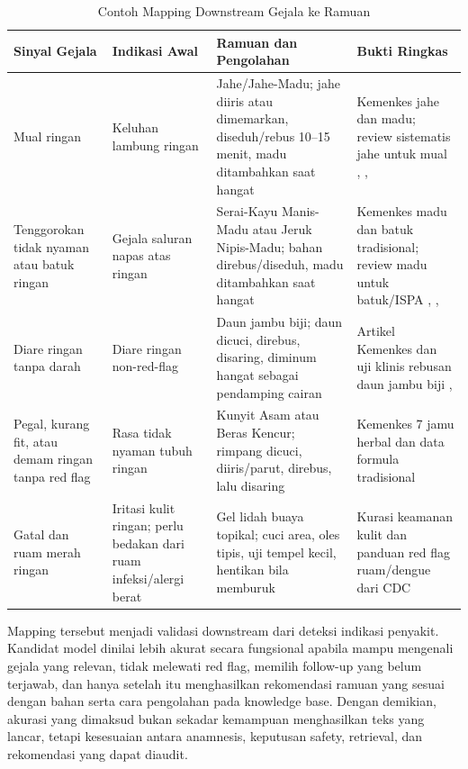 \documentclass[conference]{IEEEtran}
\begin{document}
\begin{table}[t]
\caption{Contoh Mapping Downstream Gejala ke Ramuan}
\label{tab:symptom_mapping_id}
\centering
\scriptsize
\setlength{\tabcolsep}{2pt}
\begin{tabular}{|p{1.35cm}|p{1.55cm}|p{2.2cm}|p{2.15cm}|}
\hline
\textbf{Sinyal Gejala} & \textbf{Indikasi Awal} & \textbf{Ramuan dan Pengolahan} & \textbf{Bukti Ringkas} \\
\hline
Mual ringan & Keluhan lambung ringan & Jahe/Jahe-Madu; jahe diiris atau dimemarkan, diseduh/rebus 10--15 menit, madu ditambahkan saat hangat & Kemenkes jahe dan madu; review sistematis jahe untuk mual \cite{b16}, \cite{b17}, \cite{b23} \\
\hline
Tenggorokan tidak nyaman atau batuk ringan & Gejala saluran napas atas ringan & Serai-Kayu Manis-Madu atau Jeruk Nipis-Madu; bahan direbus/diseduh, madu ditambahkan saat hangat & Kemenkes madu dan batuk tradisional; review madu untuk batuk/ISPA \cite{b17}, \cite{b18}, \cite{b24} \\
\hline
Diare ringan tanpa darah & Diare ringan non-red-flag & Daun jambu biji; daun dicuci, direbus, disaring, diminum hangat sebagai pendamping cairan & Artikel Kemenkes dan uji klinis rebusan daun jambu biji \cite{b20}, \cite{b22} \\
\hline
Pegal, kurang fit, atau demam ringan tanpa red flag & Rasa tidak nyaman tubuh ringan & Kunyit Asam atau Beras Kencur; rimpang dicuci, diiris/parut, direbus, lalu disaring & Kemenkes 7 jamu herbal dan data formula tradisional \cite{b19} \\
\hline
Gatal dan ruam merah ringan & Iritasi kulit ringan; perlu bedakan dari ruam infeksi/alergi berat & Gel lidah buaya topikal; cuci area, oles tipis, uji tempel kecil, hentikan bila memburuk & Kurasi keamanan kulit dan panduan red flag ruam/dengue dari CDC \cite{b21} \\
\hline
\end{tabular}
\end{table}

Mapping tersebut menjadi validasi downstream dari deteksi indikasi penyakit. Kandidat model dinilai lebih akurat secara fungsional apabila mampu mengenali gejala yang relevan, tidak melewati red flag, memilih follow-up yang belum terjawab, dan hanya setelah itu menghasilkan rekomendasi ramuan yang sesuai dengan bahan serta cara pengolahan pada knowledge base. Dengan demikian, akurasi yang dimaksud bukan sekadar kemampuan menghasilkan teks yang lancar, tetapi kesesuaian antara anamnesis, keputusan safety, retrieval, dan rekomendasi yang dapat diaudit.
\end{document}
